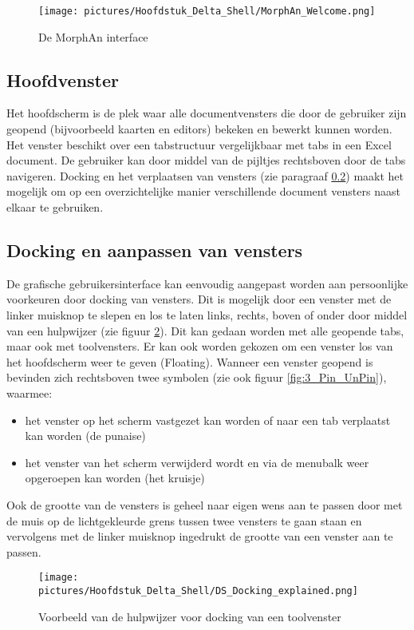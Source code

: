 \begin{figure}[H]
	\centering
		\texttt{[image: pictures/Hoofdstuk\_Delta\_Shell/MorphAn\_Welcome.png]}
		\caption{De MorphAn interface}
	\label{fig:1_MA_Welcome_Page}
\end{figure}

\subsection{Hoofdvenster}
Het hoofdscherm is de plek waar alle documentvensters die door de gebruiker zijn geopend (bijvoorbeeld kaarten en editors) bekeken en bewerkt kunnen worden. Het venster beschikt over een tabstructuur vergelijkbaar met tabs in een Excel document. De gebruiker kan door middel van de pijltjes rechtsboven door de tabs navigeren. Docking en het verplaatsen van vensters (zie paragraaf \ref{sec:DS_Docking}) maakt het mogelijk om op een overzichtelijke manier verschillende document vensters naast elkaar te gebruiken.

\subsection{Docking en aanpassen van vensters}
\label{sec:DS_Docking}
De grafische gebruikersinterface kan eenvoudig aangepast worden aan persoonlijke voorkeuren door docking van vensters. Dit is mogelijk door een venster met de linker muisknop te slepen en los te laten links, rechts, boven of onder door middel van een hulpwijzer (zie figuur \ref{fig:3_Docking}). Dit kan gedaan worden met alle geopende tabs, maar ook met toolvensters. Er kan ook worden gekozen om een venster los van het hoofdscherm weer te geven (Floating). Wanneer een venster geopend is bevinden zich rechtsboven twee symbolen (zie ook figuur \ref{fig:3_Pin_UnPin}), waarmee:
\begin{itemize}
\item het venster op het scherm vastgezet kan worden of naar een tab verplaatst kan worden (de punaise)
\item het venster van het scherm verwijderd wordt en via de menubalk weer opgeroepen kan worden (het kruisje)
\end{itemize}

Ook de grootte van de vensters is geheel naar eigen wens aan te passen door met de muis op de lichtgekleurde grens tussen twee vensters te gaan staan en vervolgens met de linker muisknop ingedrukt de grootte van een venster aan te passen.

\begin{figure}[H]
	\centering
		\texttt{[image: pictures/Hoofdstuk\_Delta\_Shell/DS\_Docking\_explained.png]}
		\caption{Voorbeeld van de hulpwijzer voor docking van een toolvenster}
	\label{fig:3_Docking}
\end{figure}

